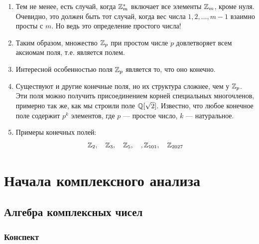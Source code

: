 \begin{enumerate}
\item Тем не менее, есть случай, когда $\mathbb Z_m^*$ включает все элементы $\mathbb Z_m$, кроме нуля. Очевидно, это должен быть тот случай, когда вес числа $1,2,\dots,m-1$ взаимно просты с $m$. Но ведь это определение простого числа!
\item Таким образом, множество $\mathbb Z_p$ при простом числе $p$ довлетворяет всем аксиомам поля, т.е. является полем. 
\item Интересной особенностью поля $\mathbb Z_p$ является то, что оно конечно.
\item Существуют и другие конечные поля, но их структура сложнее, чем у $\mathbb Z_p$. Эти поля можно получить присоединением корней специальных многочленов, примерно так же, как мы строили поле $\mathbb Q[\sqrt 2]$. Известно, что любое конечное поле содержит $p^k$ элементов, где $p$ --- простое число, $k$ --- натуральное.
\item Примеры конечных полей:
$$
\mathbb Z_2,\quad\mathbb Z_3,\quad\mathbb Z_5,\quad,\mathbb Z_{101},\quad\mathbb Z_{2027}
$$
\end{enumerate}




\chapter{Начала комплексного анализа}



\section{Алгебра комплексных чисел}

\subsection*{Конспект}

